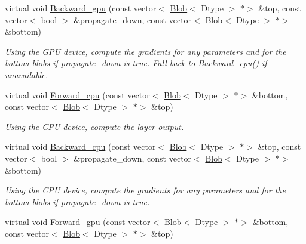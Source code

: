 \begin{DoxyCompactItemize}
virtual void \mbox{\hyperlink{classcaffe_1_1_reshape_layer_a7f433223bdd7d5e8aa9e73ee9dbea836}{Backward\+\_\+gpu}} (const vector$<$ \mbox{\hyperlink{classcaffe_1_1_blob}{Blob}}$<$ Dtype $>$ $\ast$$>$ \&top, const vector$<$ bool $>$ \&propagate\+\_\+down, const vector$<$ \mbox{\hyperlink{classcaffe_1_1_blob}{Blob}}$<$ Dtype $>$ $\ast$$>$ \&bottom)
\begin{DoxyCompactList}\small\item\em Using the G\+PU device, compute the gradients for any parameters and for the bottom blobs if propagate\+\_\+down is true. Fall back to \mbox{\hyperlink{classcaffe_1_1_reshape_layer_a8baafe3b84c6eee7709071a944355286}{Backward\+\_\+cpu()}} if unavailable. \end{DoxyCompactList}\item 
\mbox{\label{classcaffe_1_1_reshape_layer_a0529c00e9d2fa47943ba5292cfdcb6db}} 
virtual void \mbox{\hyperlink{classcaffe_1_1_reshape_layer_a0529c00e9d2fa47943ba5292cfdcb6db}{Forward\+\_\+cpu}} (const vector$<$ \mbox{\hyperlink{classcaffe_1_1_blob}{Blob}}$<$ Dtype $>$ $\ast$$>$ \&bottom, const vector$<$ \mbox{\hyperlink{classcaffe_1_1_blob}{Blob}}$<$ Dtype $>$ $\ast$$>$ \&top)
\begin{DoxyCompactList}\small\item\em Using the C\+PU device, compute the layer output. \end{DoxyCompactList}\item 
\mbox{\label{classcaffe_1_1_reshape_layer_a8baafe3b84c6eee7709071a944355286}} 
virtual void \mbox{\hyperlink{classcaffe_1_1_reshape_layer_a8baafe3b84c6eee7709071a944355286}{Backward\+\_\+cpu}} (const vector$<$ \mbox{\hyperlink{classcaffe_1_1_blob}{Blob}}$<$ Dtype $>$ $\ast$$>$ \&top, const vector$<$ bool $>$ \&propagate\+\_\+down, const vector$<$ \mbox{\hyperlink{classcaffe_1_1_blob}{Blob}}$<$ Dtype $>$ $\ast$$>$ \&bottom)
\begin{DoxyCompactList}\small\item\em Using the C\+PU device, compute the gradients for any parameters and for the bottom blobs if propagate\+\_\+down is true. \end{DoxyCompactList}\item 
\mbox{\label{classcaffe_1_1_reshape_layer_a2b75e7b2d96b46b2fbdbab0ff238a1ad}} 
virtual void \mbox{\hyperlink{classcaffe_1_1_reshape_layer_a2b75e7b2d96b46b2fbdbab0ff238a1ad}{Forward\+\_\+gpu}} (const vector$<$ \mbox{\hyperlink{classcaffe_1_1_blob}{Blob}}$<$ Dtype $>$ $\ast$$>$ \&bottom, const vector$<$ \mbox{\hyperlink{classcaffe_1_1_blob}{Blob}}$<$ Dtype $>$ $\ast$$>$ \&top)

\end{DoxyCompactItemize}
